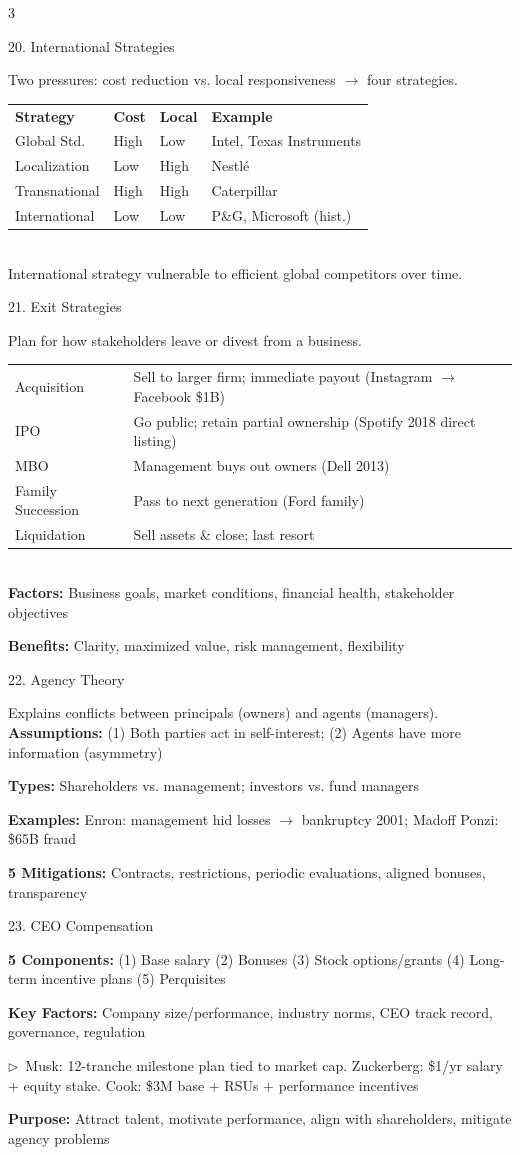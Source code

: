 \documentclass[7.5pt, letterpaper]{article}
\newcommand{\concept}[1]{%
  \vspace{2.5pt}%
  \noindent\colorbox{accent}{\parbox{\dimexpr\linewidth-2\fboxsep}{\fontsize{6.8pt}{7.5pt}\selectfont\bfseries\color{white}\strut #1\strut}}%
  \vspace{1pt}\par%
}
\newcommand{\kv}[2]{\noindent\textbf{#1:} #2\par}
\newcommand{\bul}[1]{\noindent$\triangleright$\ #1\par}
\newcommand{\minitab}[1]{%
  \begingroup
  \fontsize{6.2pt}{7pt}\selectfont
  \setlength{\tabcolsep}{2pt}
  #1
  \endgroup
}
\begin{document}
\begin{multicols}{3}
\concept{20. International Strategies}
Two pressures: cost reduction vs. local responsiveness $\to$ four strategies.\\
\minitab{\begin{tabular}{@{}llll@{}}
\textbf{Strategy} & \textbf{Cost} & \textbf{Local} & \textbf{Example}\\
Global Std. & High & Low & Intel, Texas Instruments\\
Localization & Low & High & Nestl\'{e}\\
Transnational & High & High & Caterpillar\\
International & Low & Low & P\&G, Microsoft (hist.)\\
\end{tabular}}\\
International strategy vulnerable to efficient global competitors over time.

\concept{21. Exit Strategies}
Plan for how stakeholders leave or divest from a business.\\
\minitab{\begin{tabular}{@{}ll@{}}
Acquisition & Sell to larger firm; immediate payout (Instagram $\to$ Facebook \$1B)\\
IPO & Go public; retain partial ownership (Spotify 2018 direct listing)\\
MBO & Management buys out owners (Dell 2013)\\
Family Succession & Pass to next generation (Ford family)\\
Liquidation & Sell assets \& close; last resort\\
\end{tabular}}\\
\kv{Factors}{Business goals, market conditions, financial health, stakeholder objectives}
\kv{Benefits}{Clarity, maximized value, risk management, flexibility}

\concept{22. Agency Theory}
Explains conflicts between principals (owners) and agents (managers).\\
\kv{Assumptions}{(1) Both parties act in self-interest; (2) Agents have more information (asymmetry)}
\kv{Types}{Shareholders vs. management; investors vs. fund managers}
\kv{Examples}{Enron: management hid losses $\to$ bankruptcy 2001; Madoff Ponzi: \$65B fraud}
\kv{5 Mitigations}{Contracts, restrictions, periodic evaluations, aligned bonuses, transparency}

\concept{23. CEO Compensation}
\kv{5 Components}{(1) Base salary (2) Bonuses (3) Stock options/grants (4) Long-term incentive plans (5) Perquisites}
\kv{Key Factors}{Company size/performance, industry norms, CEO track record, governance, regulation}
\bul{Musk: 12-tranche milestone plan tied to market cap. Zuckerberg: \$1/yr salary + equity stake. Cook: \$3M base + RSUs + performance incentives}
\kv{Purpose}{Attract talent, motivate performance, align with shareholders, mitigate agency problems}


\end{multicols}
\end{document}
